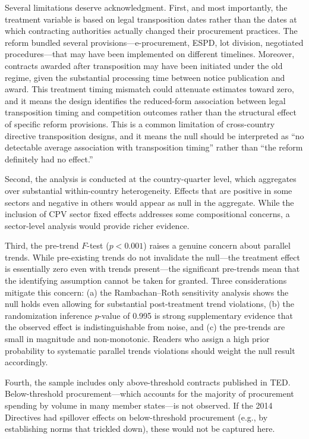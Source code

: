 \documentclass[12pt]{article}
\begin{document}
Several limitations deserve acknowledgment. First, and most importantly, the treatment variable is based on legal transposition dates rather than the dates at which contracting authorities actually changed their procurement practices. The reform bundled several provisions---e-procurement, ESPD, lot division, negotiated procedures---that may have been implemented on different timelines. Moreover, contracts awarded after transposition may have been initiated under the old regime, given the substantial processing time between notice publication and award. This treatment timing mismatch could attenuate estimates toward zero, and it means the design identifies the reduced-form association between legal transposition timing and competition outcomes rather than the structural effect of specific reform provisions. This is a common limitation of cross-country directive transposition designs, and it means the null should be interpreted as ``no detectable average association with transposition timing'' rather than ``the reform definitely had no effect.''

Second, the analysis is conducted at the country-quarter level, which aggregates over substantial within-country heterogeneity. Effects that are positive in some sectors and negative in others would appear as null in the aggregate. While the inclusion of CPV sector fixed effects addresses some compositional concerns, a sector-level analysis would provide richer evidence.

Third, the pre-trend $F$-test ($p < 0.001$) raises a genuine concern about parallel trends. While pre-existing trends do not invalidate the null---the treatment effect is essentially zero even with trends present---the significant pre-trends mean that the identifying assumption cannot be taken for granted. Three considerations mitigate this concern: (a) the Rambachan--Roth sensitivity analysis shows the null holds even allowing for substantial post-treatment trend violations, (b) the randomization inference $p$-value of 0.995 is strong supplementary evidence that the observed effect is indistinguishable from noise, and (c) the pre-trends are small in magnitude and non-monotonic. Readers who assign a high prior probability to systematic parallel trends violations should weight the null result accordingly.

Fourth, the sample includes only above-threshold contracts published in TED. Below-threshold procurement---which accounts for the majority of procurement spending by volume in many member states---is not observed. If the 2014 Directives had spillover effects on below-threshold procurement (e.g., by establishing norms that trickled down), these would not be captured here.
\end{document}
